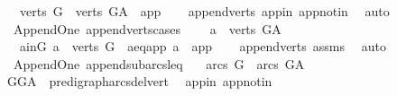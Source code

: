 \begin{isabellebody}
\ \ \ {\isachardoublequoteopen}verts\ G\ {\isacharequal}{\kern0pt}\ verts\ G{\isacharunderscore}{\kern0pt}A\ {\isacharminus}{\kern0pt}\ {\isacharbraceleft}{\kern0pt}app{\isacharbraceright}{\kern0pt}{\isachardoublequoteclose}\isanewline
%
\isadelimproof
\ \ %
\endisadelimproof
%
\isatagproof
{}\isamarkupfalse%
\ append{\isacharunderscore}{\kern0pt}verts\ app{\isacharunderscore}{\kern0pt}in\ app{\isacharunderscore}{\kern0pt}notin\ \isamarkupfalse%
\ auto%
\endisatagproof
{\isafoldproof}%
%
\isadelimproof
\isanewline
%
\endisadelimproof
\isanewline
{}\isamarkupfalse%
\ {\isacharparenleft}{\kern0pt}\ Append{\isacharunderscore}{\kern0pt}One{\isacharparenright}{\kern0pt}\ append{\isacharunderscore}{\kern0pt}verts{\isacharunderscore}{\kern0pt}cases{\isacharcolon}{\kern0pt}\ \isanewline
\ \ \ {\isachardoublequoteopen}a\ {\isasymin}\ verts\ G{\isacharunderscore}{\kern0pt}A{\isachardoublequoteclose}\isanewline
\ \ \ {\isacharparenleft}{\kern0pt}a{\isacharunderscore}{\kern0pt}in{\isacharunderscore}{\kern0pt}G{\isacharparenright}{\kern0pt}\ {\isachardoublequoteopen}a\ {\isasymin}\ verts\ G{\isachardoublequoteclose}\ {\isacharbar}{\kern0pt}\ {\isacharparenleft}{\kern0pt}a{\isacharunderscore}{\kern0pt}eq{\isacharunderscore}{\kern0pt}app{\isacharparenright}{\kern0pt}\ {\isachardoublequoteopen}a\ {\isacharequal}{\kern0pt}\ app{\isachardoublequoteclose}\isanewline
%
\isadelimproof
\ \ %
\endisadelimproof
%
\isatagproof
{}\isamarkupfalse%
\ append{\isacharunderscore}{\kern0pt}verts\ assms\ \isamarkupfalse%
\ auto%
\endisatagproof
{\isafoldproof}%
%
\isadelimproof
\isanewline
%
\endisadelimproof
\isanewline
{}\isamarkupfalse%
\ {\isacharparenleft}{\kern0pt}\ Append{\isacharunderscore}{\kern0pt}One{\isacharparenright}{\kern0pt}\ append{\isacharunderscore}{\kern0pt}subarcs{\isacharunderscore}{\kern0pt}leq{\isacharcolon}{\kern0pt}\ \isanewline
\ \ {\isachardoublequoteopen}arcs\ G\ {\isasymsubseteq}\ arcs\ G{\isacharunderscore}{\kern0pt}A{\isachardoublequoteclose}\isanewline
%
\isadelimproof
\ \ %
\endisadelimproof
%
\isatagproof
{}\isamarkupfalse%
\ GG{\isacharunderscore}{\kern0pt}A\ \ pre{\isacharunderscore}{\kern0pt}digraph{\isachardot}{\kern0pt}arcs{\isacharunderscore}{\kern0pt}del{\isacharunderscore}{\kern0pt}vert\ \isamarkupfalse%
\ app{\isacharunderscore}{\kern0pt}in\ app{\isacharunderscore}{\kern0pt}notin\ \isanewline
\ \ \isamarkupfalse%

\end{isabellebody}
